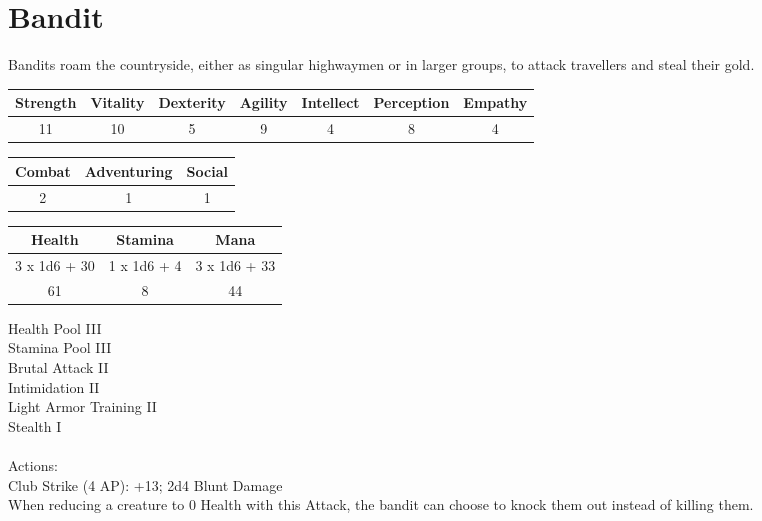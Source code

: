 \section{Bandit}

Bandits roam the countryside, either as singular highwaymen or in larger groups, to attack travellers and steal their gold.

\begin{minipage}[H]{1\textwidth}
	\centering
	\begin{tabular}[c]{|c | c | c | c | c | c | c|}
		\hline
		Strength & Vitality & Dexterity & Agility & Intellect & Perception & Empathy\\
		\hline
		11 & 10 & 5 & 9 & 4 & 8 & 4\\
		\hline
	\end{tabular}
\end{minipage}
\bigbreak
\begin{minipage}[H]{1\textwidth}
	\centering
	\begin{tabular}[c]{|c | c | c|}
		\hline
		Combat & Adventuring & Social\\
		\hline
		2 & 1 & 1\\
		\hline
	\end{tabular}
\end{minipage}
\bigbreak
\begin{minipage}[H]{1\textwidth}
	\centering
	\begin{tabular}[c]{|c | c | c|}
		\hline
		Health & Stamina & Mana\\
		\hline
		3 x 1d6 + 30 & 1 x 1d6 + 4 & 3 x 1d6 + 33\\
		61 & 8 & 44\\
		\hline
	\end{tabular}
\end{minipage}
\noindent
Health Pool III\\
Stamina Pool III\\
Brutal Attack II\\
Intimidation II\\
Light Armor Training II\\
Stealth I\\
\\
Actions:\\
Club Strike (4 AP): +13; 2d4 Blunt Damage\\
When reducing a creature to 0 Health with this Attack, the bandit can choose to knock them out instead of killing them.\\
